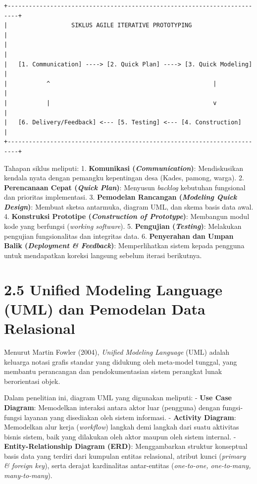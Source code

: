 \documentclass[
  indonesian,
  12pt,
]{report}
\begin{document}
\begin{verbatim}
+-------------------------------------------------------------------------+
|                  SIKLUS AGILE ITERATIVE PROTOTYPING                     |
|                                                                         |
|   [1. Communication] ----> [2. Quick Plan] ----> [3. Quick Modeling]    |
|           ^                                              |              |
|           |                                              v              |
|   [6. Delivery/Feedback] <--- [5. Testing] <--- [4. Construction]       |
+-------------------------------------------------------------------------+
\end{verbatim}

Tahapan siklus meliputi: 1. \textbf{Komunikasi (\emph{Communication})}:
Mendiskusikan kendala nyata dengan pemangku kepentingan desa (Kades,
pamong, warga). 2. \textbf{Perencanaan Cepat (\emph{Quick Plan})}:
Menyusun \emph{backlog} kebutuhan fungsional dan prioritas implementasi.
3. \textbf{Pemodelan Rancangan (\emph{Modeling Quick Design})}: Membuat
sketsa antarmuka, diagram UML, dan skema basis data awal. 4.
\textbf{Konstruksi Prototipe (\emph{Construction of Prototype})}:
Membangun modul kode yang berfungsi (\emph{working software}). 5.
\textbf{Pengujian (\emph{Testing})}: Melakukan pengujian fungsionalitas
dan integritas data. 6. \textbf{Penyerahan dan Umpan Balik
(\emph{Deployment \& Feedback})}: Memperlihatkan sistem kepada pengguna
untuk mendapatkan koreksi langsung sebelum iterasi berikutnya.

\section{2.5 Unified Modeling Language (UML) dan Pemodelan Data
Relasional}\label{unified-modeling-language-uml-dan-pemodelan-data-relasional}

Menurut Martin Fowler (2004), \emph{Unified Modeling Language} (UML)
adalah keluarga notasi grafis standar yang didukung oleh meta-model
tunggal, yang membantu perancangan dan pendokumentasian sistem perangkat
lunak berorientasi objek.

Dalam penelitian ini, diagram UML yang digunakan meliputi: - \textbf{Use
Case Diagram}: Memodelkan interaksi antara aktor luar (pengguna) dengan
fungsi-fungsi layanan yang disediakan oleh sistem informasi. -
\textbf{Activity Diagram}: Memodelkan alur kerja (\emph{workflow})
langkah demi langkah dari suatu aktivitas bisnis sistem, baik yang
dilakukan oleh aktor maupun oleh sistem internal. -
\textbf{Entity-Relationship Diagram (ERD)}: Menggambarkan struktur
konseptual basis data yang terdiri dari kumpulan entitas relasional,
atribut kunci (\emph{primary \& foreign key}), serta derajat
kardinalitas antar-entitas (\emph{one-to-one, one-to-many,
many-to-many}).
\end{document}

